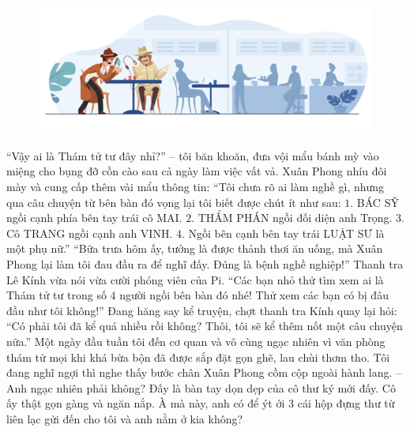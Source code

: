 	\begin{figure}[H]
			\centering
			\vspace*{-5pt}
			\captionsetup{labelformat= empty, justification=centering}
			\includegraphics[width=1\linewidth]{4}
			\vspace*{-15pt}
		\end{figure}
	“Vậy ai là Thám tử tư đây nhỉ?” -- tôi băn khoăn, đưa vội mẩu bánh mỳ vào miệng cho bụng đỡ cồn cào sau cả ngày làm việc vất vả. 
	\vskip 0.1cm
	Xuân Phong nhíu đôi mày và cung cấp thêm vài mẩu thông tin: “Tôi chưa rõ ai làm nghề gì, nhưng qua câu chuyện từ bên bàn đó vọng lại tôi biết được chút ít như sau: 
	\vskip 0.1cm
	$1.$ BÁC SỸ ngồi cạnh phía bên tay trái cô MAI. 
	\vskip 0.1cm
	$2.$ THẨM PHÁN ngồi đối diện anh Trọng.
	\vskip 0.1cm
	$3.$ Cô TRANG ngồi cạnh anh VINH. 
	\vskip 0.1cm
	$4.$ Ngồi bên cạnh bên tay trái LUẬT SƯ là một phụ nữ.” 
	\vskip 0.1cm
	“Bữa trưa hôm ấy, tưởng là được thảnh thơi ăn uống, mà Xuân Phong lại làm tôi đau đầu ra để nghĩ đấy. Đúng là bệnh nghề nghiệp!” Thanh tra Lê Kính vừa nói vừa cười phóng viên của Pi. “Các bạn nhỏ thử tìm xem ai là Thám tử tư trong số $4$ người ngồi bên bàn đó nhé! Thử xem các bạn có bị đâu đầu như tôi không!”
	\vskip 0.1cm
	Đang hăng say kể truyện, chợt thanh tra Kính quay lại hỏi: “Có phải tôi đã kể quá nhiều rồi không? Thôi, tôi sẽ kể thêm nốt một câu chuyện nữa.”
	\vskip 0.1cm
	\textbf{\color{toancuabi}{BA CHIẾC HỘP VÀ CÔ THƯ KÝ}}
	\vskip 0.1cm
	Một ngày đầu tuần tôi đến cơ quan và vô cùng ngạc nhiên vì văn phòng thám tử mọi khi khá bừa bộn đã được sắp đặt gọn ghẽ, lau chùi thơm tho. Tôi đang nghĩ ngợi thì nghe thấy bước chân Xuân Phong cồm cộp ngoài hành lang. 
	\vskip 0.1cm
	-- Anh ngạc nhiên phải không? Đấy là bàn tay dọn dẹp của cô thư ký mới đấy. Cô ấy thật gọn gàng và ngăn nắp. À mà này, anh có để ýt ới $3$ cái hộp đựng thư từ liên lạc gửi đến cho tôi và anh nằm ở kia không? 
